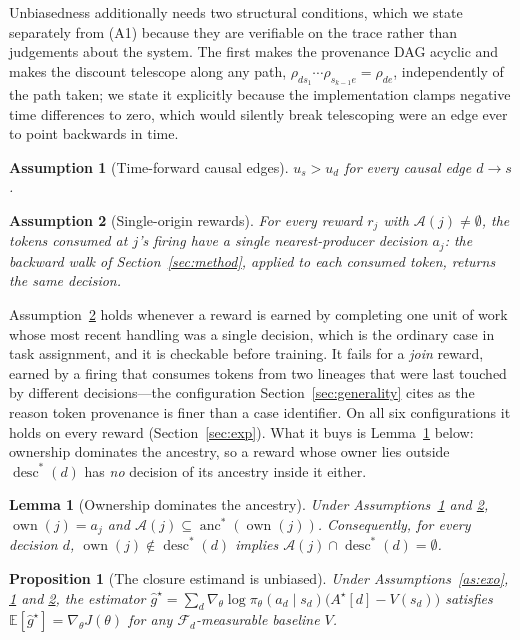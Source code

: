 \documentclass[review,authoryear,3p,times]{elsarticle}
\newtheorem{proposition}{Proposition}
\newtheorem{assumption}{Assumption}
\newtheorem{lemma}{Lemma}
\newcommand{\Fscr}{\mathcal{F}}
\newcommand{\Ascr}{\mathcal{A}}
\newcommand{\Ex}{\mathbb{E}}
\newcommand{\desc}{\operatorname{desc}}
\newcommand{\anc}{\operatorname{anc}}
\newcommand{\own}{\operatorname{own}}
\begin{document}
Unbiasedness additionally needs two structural conditions, which we state
separately from (A1) because they are verifiable on the trace rather than
judgements about the system. The first makes the provenance DAG acyclic and
makes the discount telescope along any path,
$\rho_{d s_1}\cdots\rho_{s_{k-1}e} = \rho_{de}$, independently of the path
taken; we state it explicitly because the implementation clamps negative time
differences to zero, which would silently break telescoping were an edge ever
to point backwards in time.

\begin{assumption}[Time-forward causal edges]
\label{as:time}
$u_s > u_d$ for every causal edge $d\!\to\!s$.
\end{assumption}

\begin{assumption}[Single-origin rewards]
\label{as:origin}
For every reward $r_j$ with $\Ascr(j)\neq\emptyset$, the tokens consumed at
$j$'s firing have a \emph{single} nearest-producer decision $a_j$: the backward
walk of Section~\ref{sec:method}, applied to each consumed token, returns the
same decision.
\end{assumption}

Assumption~\ref{as:origin} holds whenever a reward is earned by completing one
unit of work whose most recent handling was a single decision, which is the
ordinary case in task assignment, and it is checkable before training. It fails
for a \emph{join} reward, earned by a firing that consumes tokens from two
lineages that were last touched by different decisions---the configuration
Section~\ref{sec:generality} cites as the reason token provenance is finer than
a case identifier. On all six configurations it holds on every reward
(Section~\ref{sec:exp}). What it buys is Lemma~\ref{lem:own} below: ownership
dominates the ancestry, so a reward whose owner lies outside $\desc^{*}(d)$ has
\emph{no} decision of its ancestry inside it either.

\begin{lemma}[Ownership dominates the ancestry]
\label{lem:own}
Under Assumptions~\ref{as:time} and \ref{as:origin},
$\own(j)=a_j$ and $\Ascr(j)\subseteq\anc^{*}(\own(j))$. Consequently, for every
decision $d$, $\own(j)\notin\desc^{*}(d)$ implies
$\Ascr(j)\cap\desc^{*}(d)=\emptyset$.
\end{lemma}

\begin{proposition}[The closure estimand is unbiased]
\label{prop:star}
Under Assumptions~\ref{as:exo}, \ref{as:time} and \ref{as:origin}, the estimator
$\hat g^{\star}=\sum_{d}\nabla_\theta\log\pi_\theta(a_d\mid s_d)\bigl(A^{\star}[d]-V(s_d)\bigr)$
satisfies $\Ex[\hat g^{\star}]=\nabla_\theta J(\theta)$ for any
$\Fscr_d$-measurable baseline $V$.
\end{proposition}
\end{document}
